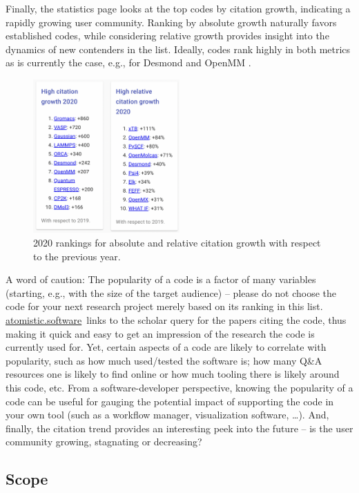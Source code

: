 \documentclass[9pt,review]{livecoms}
\newcommand{\atsoft}{\href{https://atomistic.software}{atomistic.software}\ }
\begin{document}
Finally, the statistics page looks at the top codes by citation growth, indicating a rapidly growing user community. 
Ranking by absolute growth naturally favors established codes, while considering relative growth provides insight into the dynamics of new contenders in the list.
Ideally, codes rank highly in both metrics as is currently the case, e.g., for Desmond \cite{Desmond2021} and OpenMM \cite{Eastman2017}.

\begin{figure}
    \includegraphics[width=0.5\textwidth]{figures/highly-cited}
    \caption{
        2020 rankings for absolute and relative citation growth with respect to the previous year.
    }
    \label{fig:highly-cited}
\end{figure}

A word of caution: The popularity of a code is a factor of many variables (starting, e.g., with the size of the target audience) -- please do not choose the code for your next research project merely based on its ranking in this list.
\atsoft links to the scholar query for the papers citing the code, thus making it quick and easy to get an impression of the research the code is currently used for.
Yet, certain aspects of a code are likely to correlate with popularity, such as how much used/tested the software is; how many Q\&A resources one is likely to find online or how much tooling there is likely around this code, etc. 
From a software-developer perspective, knowing the popularity of a code can be useful for gauging the potential impact of supporting the code in your own tool (such as a workflow manager, visualization software, \ldots).
And, finally, the citation trend provides an interesting peek into the future -- is the user community growing, stagnating or decreasing?


\subsection{Scope}
\end{document}
